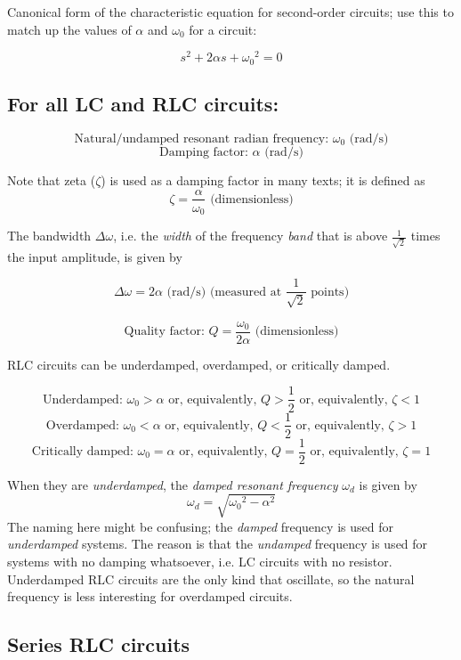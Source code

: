 Canonical form of the characteristic equation for second-order circuits; use this to match up the values of $\alpha$ and $\omega_0$ for a circuit:

\[ s^2 + 2\alpha s + {\omega_0}^2 = 0 \]

\subsection{For all LC and RLC circuits:}

\[ \text{Natural/undamped resonant radian frequency: } \omega_0 \text{ (rad/s)} \]
\[ \text{Damping factor: } \alpha \text{ (rad/s)} \]

Note that zeta ($\zeta$) is used as a damping factor in many texts; it is defined as
\[ \zeta = \frac{\alpha}{\omega_0} \text{ (dimensionless)} \]

The bandwidth $\Delta \omega$, i.e. the \emph{width} of the frequency \emph{band} that is above $\displaystyle \frac{1}{\sqrt{2}}$ times the input amplitude, is given by

\[ \Delta \omega = 2 \alpha \text{ (rad/s) (measured at } \frac{1}{\sqrt{2}} \text{ points)} \]

\[ \text{Quality factor: } Q = \frac{\omega_0}{2\alpha} \text{ (dimensionless)} \]

RLC circuits can be underdamped, overdamped, or critically damped.

\[ \text{Underdamped: } \omega_0 > \alpha \text{ or, equivalently, } Q > \frac{1}{2} \text { or, equivalently, } \zeta < 1 \]
\[ \text{Overdamped: } \omega_0 < \alpha \text{ or, equivalently, } Q < \frac{1}{2} \text { or, equivalently, } \zeta > 1 \]
\[ \text{Critically damped: } \omega_0 = \alpha \text{ or, equivalently, } Q = \frac{1}{2} \text { or, equivalently, } \zeta = 1 \]

When they are \emph{underdamped}, the \emph{damped resonant frequency} $\omega_d$ is given by
\[ \omega_d = \sqrt{{\omega_0}^2 - \alpha^2} \]
The naming here might be confusing; the \emph{damped} frequency is used for \emph{underdamped} systems. The reason is that the \emph{undamped} frequency is used for systems with no damping whatsoever, i.e. LC circuits with no resistor.\\
Underdamped RLC circuits are the only kind that oscillate, so the natural frequency is less interesting for overdamped circuits.

\subsection{Series RLC circuits}

